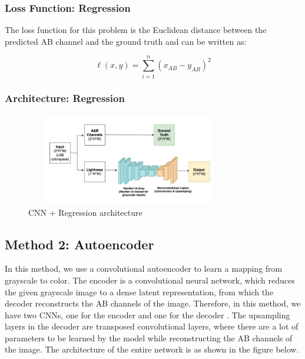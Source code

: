 \documentclass{article}
\begin{document}

\subsubsection{Loss Function: Regression}
The loss function for this problem is the Euclidean distance between the predicted AB channel and the ground truth and can be written as:

{\Large
\begin{equation}
    \ell(x,y) = \sum_{i=1}^{n} \left( x_{AB} - y_{AB} \right)^2
\end{equation}}


\subsubsection{Architecture: Regression}
\begin{figure}[htbp!]
    \centering
        \includegraphics[width=9cm, height=4cm]{reg.jpg}
        \caption{CNN + Regression architecture}
    \end{figure}
    

\subsection{Method 2: Autoencoder}
In this method, we use a convolutional autoencoder to learn a mapping from grayscale to color.
The encoder is a convolutional neural network, which reduces the given grayscale image to a dense latent representation, from which the decoder reconstructs the AB channels of the image.
Therefore, in this method, we have two CNNs, one for the encoder and one for the decoder \cite{2}.
The upsampling layers in the decoder are transposed convolutional layers, where there are a lot of parameters to be learned by the model while reconstructing the AB channels of the image.
The architecture of the entire network is as shown in the figure below. 
\end{document}

